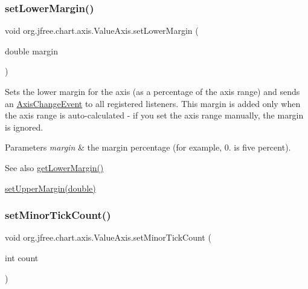 \subsubsection{\texorpdfstring{set\+Lower\+Margin()}{setLowerMargin()}}
{\footnotesize\ttfamily void org.\+jfree.\+chart.\+axis.\+Value\+Axis.\+set\+Lower\+Margin (\begin{DoxyParamCaption}\item[{double}]{margin }\end{DoxyParamCaption})}

Sets the lower margin for the axis (as a percentage of the axis range) and sends an \mbox{\hyperlink{}{Axis\+Change\+Event}} to all registered listeners. This margin is added only when the axis range is auto-\/calculated -\/ if you set the axis range manually, the margin is ignored.


\begin{DoxyParams}{Parameters}
{\em margin} & the margin percentage (for example, 0. is five percent).\\
\hline
\end{DoxyParams}
\begin{DoxySeeAlso}{See also}
\mbox{\hyperlink{classorg_1_1jfree_1_1chart_1_1axis_1_1_value_axis_aad1a68a143582b583b76f5b632014f50}{get\+Lower\+Margin()}} 

\mbox{\hyperlink{classorg_1_1jfree_1_1chart_1_1axis_1_1_value_axis_a6ba839a843d27cf2f79a10a20dd98650}{set\+Upper\+Margin(double)}} 
\end{DoxySeeAlso}
\mbox{\label{classorg_1_1jfree_1_1chart_1_1axis_1_1_value_axis_a4c9475cb0828091509a36f19d300f84c}} 
\subsubsection{\texorpdfstring{set\+Minor\+Tick\+Count()}{setMinorTickCount()}}
{\footnotesize\ttfamily void org.\+jfree.\+chart.\+axis.\+Value\+Axis.\+set\+Minor\+Tick\+Count (\begin{DoxyParamCaption}\item[{int}]{count }\end{DoxyParamCaption})}


